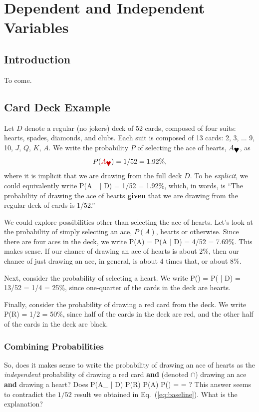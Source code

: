 \chapter{Dependent and Independent Variables}

\section{Introduction}

To come.

\section{Card Deck Example}

Let $D$ denote a regular (no jokers) deck of 52 cards, 
composed of four suits: hearts, spades, diamonds, and clubs.  
Each suit is composed of 13 cards: 2, 3, ... 9, 10, $J$, $Q$, $K$, $A$.
We write the probability $P$ of selecting the ace of hearts, 
{\color{red}$A_{\mbox{\ding{170}}}$}, as
\begin{equation}
P({\color{red}A_{\mbox{\ding{170}}}}) = 1/52 = 1.92\%,
\label{eq:baseline}
\end{equation}
where it is implicit that we are
drawing from the full deck $D$.  To be {\em explicit}, we could 
equivalently write 
\be
P({\color{red}A_{\mbox{}}} | D) = 1/52 = 1.92\%,
\ee
which, in words, is ``The probability of drawing the ace of 
hearts {\bf given} that we are drawing from the 
regular deck of cards is 1/52.''

We could explore possibilities other than selecting the ace of hearts.  
Let's look at the probability of simply selecting an ace, $P(A)$, 
hearts or otherwise.  
Since there are four
aces in the deck, we write
\be
P(A) = P(A | D) = 4/52 = 7.69\%.
\ee
This makes sense.  If our chance of drawing an ace of hearts 
is about $2\%$, then our 
chance of just drawing an ace, in general, is about 4 times that, 
or about $8\%$.  

Next, consider the probability of selecting a heart.  We write
\be
P({\color{red}\mbox{}}) 
= P({\color{red}\mbox{}} | D) = 13/52 = 1/4 = 25\%,
\ee
since one-quarter of the cards in the deck are hearts.

Finally, consider the probability of drawing a red card from 
the deck.  We write
\be
P({\color{red}R}) = 1/2 = 50\%,
\ee
since half of the cards in the deck are red, and the other 
half of the cards in the deck 
are black.

\subsection{Combining Probabilities}
So, does it makes sense to write the probability of 
drawing an ace of hearts as the 
{\em independent} probability of drawing a red 
card {\bf and} (denoted $\cap$) drawing an ace
{\bf and} drawing a heart?
Does
\be
P({\color{red}A_{\mbox{}}} | D) 
P({\color{red}R}) \;\cap\; P(A) \;\cap\; 
P({\color{red}\mbox{}}) 
=  \cdot{} \cdot{} = ?
\label{eq:double_count}
\ee
This answer seems to contradict the $1/52$ result 
we obtained in Eq.~(\ref{eq:baseline}).
What is the explanation?

